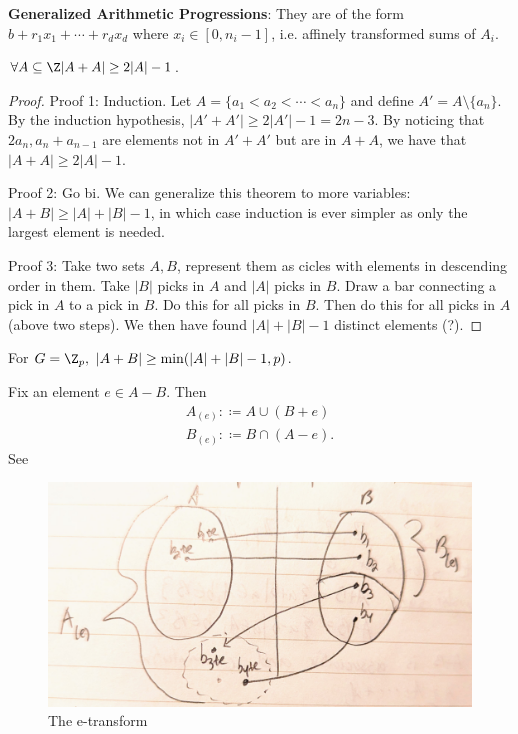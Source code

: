 \documentclass[a4paper]{article}
\begin{document}
\begin{definition}
	\textbf{Generalized Arithmetic Progressions}: They are of the form $b + r_{1}x_{1}+\cdots + r_dx_d $ where $x_i \in [0,n_i-1]$, i.e. affinely transformed sums of $A_i $.
\end{definition}

\begin{thm}
	$\forall A \subseteq \Z |A+A| \ge 2|A|-1$.
\end{thm}

\begin{proof}
	Proof 1: Induction. Let $A = \{a_{1} < a_{2} < \cdots < a_n\}   $ and define $A' = A \setminus \{a_n\}   $.
	By the induction hypothesis, $|A'+A'| \ge 2|A'| - 1 = 2n-3 $.
	By noticing that $2a_n, a_n + a_{n-1} $ are elements not in $A'+A' $ but are in $A+A $, we have that $|A+A| \ge 2|A| - 1 $.

	Proof 2: Go bi. We can generalize this theorem to more variables: $|A+B| \ge |A| + |B| - 1 $, in which case induction is ever simpler as only the largest element is needed.

	Proof 3: Take two sets $A,B $, represent them as cicles with elements in descending order in them.
	Take $|B| $ picks in $A $ and $|A| $ picks in $B $.
	Draw a bar connecting a pick in $A $ to a pick in $B $.
	Do this for all picks in $B $.
	Then do this for all picks in $A $ (above two steps).
	We then have found $|A| + |B| - 1 $ distinct elements (?).
\end{proof}

\begin{thm}
	For $G = \Z_p,\ |A+B| \ge \min(|A|+|B| - 1, p) $.
\end{thm}

\begin{definition}
	Fix an element $e \in A-B $.
	Then
	\begin{align*}
		A_{(e)} :\coloneqq  A \cup (B+e) \\
		B_{(e)} :\coloneqq B \cap (A - e)
	.\end{align*}
	See 
\end{definition}

\begin{figure}[ht]
	\centering
	\includegraphics[width = .5\textwidth]{wall}
	\caption{The e-transform \label{fig:e-transform}}
\end{figure}
\end{document}
